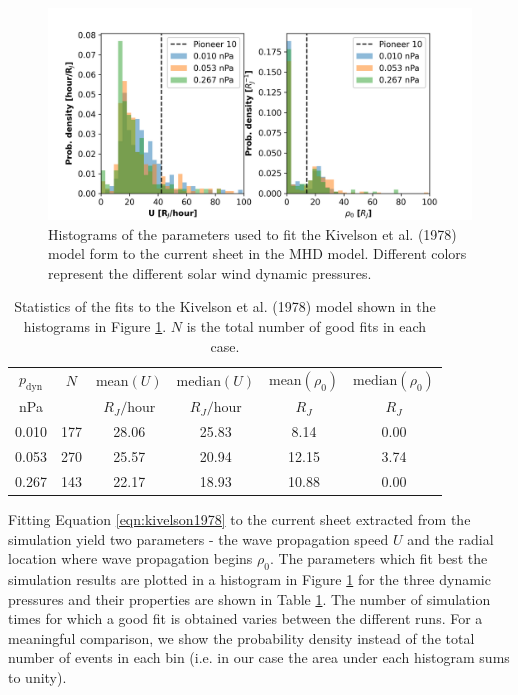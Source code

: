 \begin{figure}
    \centering
    \includegraphics[width=\textwidth]{images5/comparison_highdynP_kivelson.png}
    \caption{Histograms of the parameters used to fit the Kivelson et al. (1978) model form to the current sheet in the MHD model. Different colors represent the different solar wind dynamic pressures.}
    \label{fig:comparison-hist-kivelson}
\end{figure}

\begin{table}
    \centering
    \begin{tabular}{c|c|c|c|c|c}
     $p_\text{dyn}$&      $N$&     mean$(U)$ &   $\text{median}(U)$ &  mean$(\rho_0)$ &   $\text{median}(\rho_0)$\\
     nPa&  &  $R_J/$hour& $R_J/$hour& $R_J$& $R_J$\\
    \hline
     0.010 &  177 &  28.06 &  25.83 &   8.14 &     0.00 \\
     0.053 &  270 &  25.57 &  20.94 &  12.15 &     3.74\\
     0.267 &  143 &  22.17 &  18.93 &  10.88 &     0.00 \\

    \end{tabular}
    \caption{Statistics of the fits to the Kivelson et al. (1978) model shown in the histograms in Figure \protect\ref{fig:comparison-hist-kivelson}. $N$ is the total number of good fits in each case.}
    \label{tab:comparison-kivelson}
\end{table}


Fitting Equation \ref{eqn:kivelson1978} to the current sheet extracted from the simulation yield two parameters - the wave propagation speed $U$ and the radial location where wave propagation begins $\rho_0$. The parameters which fit best the simulation results are plotted in a histogram in Figure 
\ref{fig:comparison-hist-kivelson} for the three dynamic pressures and their properties are shown in Table \ref{tab:comparison-kivelson}. The number of simulation times for which a good fit is obtained varies between the different runs. For a meaningful comparison, we show the probability density instead of the total number of events in each bin (i.e. in our case the area under each histogram sums to unity). 

